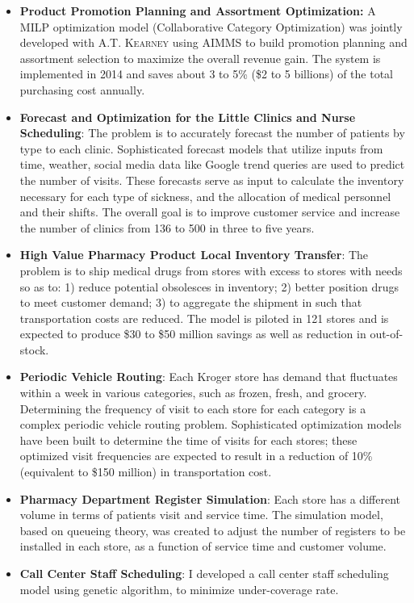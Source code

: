 \documentclass[12pt,a4paper,sans]{moderncv} %
\begin{document}
\begin{itemize}
\item \textbf{Product Promotion Planning and Assortment Optimization:} A MILP optimization model (Collaborative Category Optimization) was
jointly developed with \textsc{A.T. Kearney} using AIMMS to build promotion planning and
assortment selection to maximize the overall revenue gain.
The system is implemented in 2014 and saves about 3 to 5\% (\$2 to 5 billions) of the total purchasing cost annually.
\item \textbf{Forecast and Optimization for the Little Clinics and Nurse Scheduling}: The problem is
to accurately forecast the number of patients by type to each clinic.
Sophisticated forecast models that utilize inputs from time, weather, social
media data like Google trend queries are used to predict the number of
visits. These forecasts serve as input to calculate the inventory necessary for
each type of sickness, and the allocation of medical personnel and their
shifts. The overall goal is to improve customer service and increase the number
of clinics from 136 to 500 in three to five years.
\item \textbf{High Value Pharmacy Product Local Inventory Transfer}:  The problem is to ship 
medical drugs from stores with excess to stores with needs so as to: 1) reduce
potential obsolesces in inventory; 2) better position drugs to meet customer
demand; 3) to aggregate the shipment in such that transportation costs are
reduced. The model is piloted in 121 stores and is expected
to produce \$30 to \$50 million savings as well as reduction in
out-of-stock.

 \item \textbf{Periodic Vehicle Routing}: Each Kroger store has demand that
 fluctuates within a week in various categories, such as frozen, fresh, and
 grocery. Determining the frequency of visit to each store for each category is
 a complex periodic vehicle routing problem. Sophisticated optimization models
 have been built to determine the time of visits for each stores;  these
 optimized visit frequencies are expected to result in a reduction of 10\%
 (equivalent to \$150 million) in transportation cost.
 \item \textbf{Pharmacy Department Register Simulation}: Each store has a
 different volume in terms of patients visit and service time. The simulation
 model, based on queueing theory, was created to adjust the number of registers to be installed in
 each store, as a function of service time and customer volume.


\item \textbf{Call Center Staff Scheduling}:
I developed a call center staff scheduling model using genetic algorithm, to minimize under-coverage rate.
\end{itemize} 
 
\end{document}
